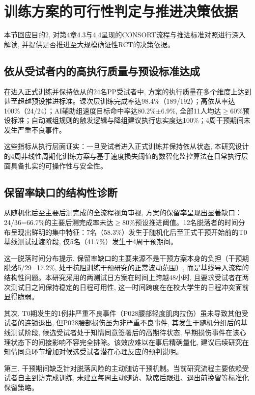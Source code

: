 \section{训练方案的可行性判定与推进决策依据}
\label{sec:feasibility_discussion}

本节回应目的2, 对第4章4.3与4.4呈现的CONSORT流程与推进标准对照进行深入解读, 并提供是否推进至大规模确证性RCT的决策依据。

\subsection{依从受试者内的高执行质量与预设标准达成}
\label{sec:high_compliance}

在进入正式训练并保持依从的24名PP受试者中, 方案的执行质量在多个维度上达到甚至超越预设推进标准。课次层训练完成率达98.4\%（189/192）；高依从率达100\%（24/24）；AI辅助组速度目标命中率达80.2\%$\pm$6.9\%, 全部11人均达$\geq$60\%预设标准；自动减组规则的触发逻辑与降组建议执行忠实度达100\%；4周干预期间未发生严重不良事件。

这些指标从执行层面证实：一旦受试者进入正式训练并保持依从状态, 本研究设计的4周非线性周期化训练方案与基于速度损失阈值的数智化监控算法在日常执行层面具备扎实的可操作性与安全性。

\subsection{保留率缺口的结构性诊断}
\label{sec:retention_gap}

从随机化后至主要后测完成的全流程视角审视, 方案的保留率呈现出显著缺口：24/36=66.7\%的主要后测完成率未达$\geq$80\%预设推进阈值。12名脱落者的时间分布呈现出鲜明的集中特征：7名（58.3\%）发生于随机化后至正式干预开始前的T0基线测试过渡阶段, 仅5名（41.7\%）发生于4周干预期间。

这一脱落时间分布提示, 保留率缺口的主要来源不是干预方案本身的负担（干预期脱落5/29=17.2\%, 处于抗阻训练干预研究的正常波动范围）, 而是基线导入流程的结构性问题。本研究采用的两测试日方案在时间上跨越48小时, 且要求受试者在两次测试日之间保持稳定的日程可用性, 这一时间跨度在在校大学生的日程冲突面前显得脆弱。

其次, T0期发生的1例非严重不良事件（P028腰部轻度肌肉拉伤）虽未导致其他受试者的连锁退出, 但P028腰部损伤虽为非严重不良事件, 其发生于随机分组后的基线测试阶段, 候选受试者处于知情同意签署后的高期待状态, 早期损伤事件在该心理状态下的间接影响不容完全排除。该效应难以在事后精确量化, 建议后续研究在知情同意环节增加对候选受试者潜在心理反应的预判说明。

第三, 干预期间缺乏针对脱落风险的主动随访干预机制。当前研究流程主要依赖受试者自主到访完成训练, 未建立每周主动随访、缺席后跟进、退出前挽留等标准化保留策略。

